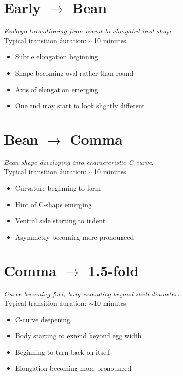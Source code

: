 \documentclass[11pt,letterpaper]{article}
\begin{document}
\section{Early $\rightarrow$ Bean}
\textit{Embryo transitioning from round to elongated oval shape.}\\
Typical transition duration: $\sim$10 minutes.

\begin{itemize}
    \item Subtle elongation beginning
    \item Shape becoming oval rather than round
    \item Axis of elongation emerging
    \item One end may start to look slightly different
\end{itemize}

\section{Bean $\rightarrow$ Comma}
\textit{Bean shape developing into characteristic C-curve.}\\
Typical transition duration: $\sim$10 minutes.

\begin{itemize}
    \item Curvature beginning to form
    \item Hint of C-shape emerging
    \item Ventral side starting to indent
    \item Asymmetry becoming more pronounced
\end{itemize}

\section{Comma $\rightarrow$ 1.5-fold}
\textit{Curve becoming fold, body extending beyond shell diameter.}\\
Typical transition duration: $\sim$10 minutes.

\begin{itemize}
    \item C-curve deepening
    \item Body starting to extend beyond egg width
    \item Beginning to turn back on itself
    \item Elongation becoming more pronounced
\end{itemize}
\end{document}
